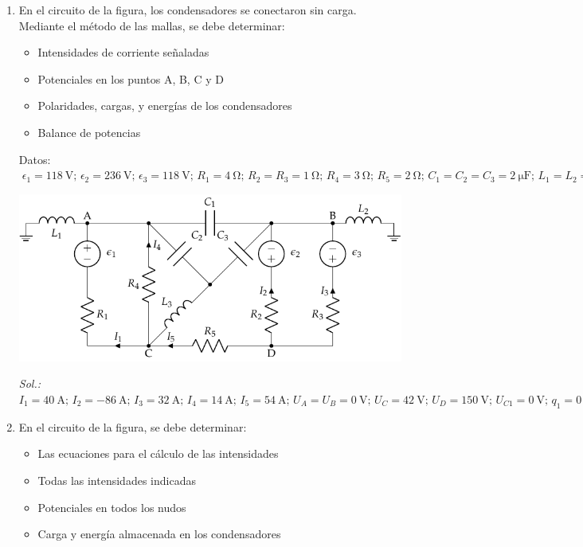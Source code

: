 \begin{enumerate}
\item En el circuito de la figura, los condensadores se conectaron sin
  carga. Mediante el método de las mallas, se debe determinar:
  \begin{itemize}
  \item Intensidades de corriente señaladas
  \item Potenciales en los puntos A, B, C y D
  \item Polaridades, cargas, y energías de los condensadores
  \item Balance de potencias
  \end{itemize}
  Datos:
  $\; \epsilon_{1}=\qty{118}{\volt};\, \epsilon_{2}=\qty{236}{\volt};\, \epsilon_{3}=\qty{118}{\volt};\,
  R_{1}= \qty{4}{\ohm};\, R_{2}=R_{3}=\qty{1}{\ohm};\, R_{4}= \qty{3}{\ohm};\,
  R_{5}=\qty{2}{\ohm};\, C_{1}=C_{2}=C_{3}=\qty{2}{\micro\farad};\, L_1 = L_2 = L_3 = \qty{1}{\milli\henry}$
  \begin{center}
    \includegraphics{../figs/mallas_condensadores.pdf}
  \end{center}

  \emph{Sol.:\;
    $I_1=\qty{40}{\ampere};\, I_2=\qty{-86}{\ampere};\, I_3=\qty{32}{\ampere};\, I_4=\qty{14}{\ampere};\, I_5=\qty{54}{\ampere};\, U_A=U_B=\qty{0}{\volt};\,
    U_C=\qty{42}{\volt};\, U_D=\qty{150}{\volt};\, U_{C1}=\qty{0}{\volt};\, q_1=\qty{0}{\coulomb};\, E_{C1}=\qty{0}{\joule};\, U_{C2}=\qty{-42}{\volt};\,
    q_2=\qty{84}{\micro\coulomb};\, E_{C2}=\qty{1.76}{\milli\joule};\, U_{C3}=\qty{-42}{\volt};\, q_3=\qty{84}{\micro\coulomb};\, E_{C3}=\qty{1.76}{\milli\joule};\, P_g = P_R$}

\item En el circuito de la figura, se debe determinar:
  \begin{itemize}
  \item Las ecuaciones para el cálculo de las intensidades
  \item Todas las intensidades indicadas
  \item Potenciales en todos los nudos
  \item Carga y energía almacenada en los condensadores
  \end{itemize}


\end{enumerate}
